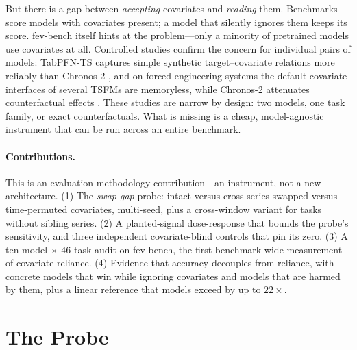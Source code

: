 \documentclass[letterpaper]{article}
\begin{document}
But there is a gap between \emph{accepting} covariates and \emph{reading} them.
Benchmarks score models with covariates present; a model that silently ignores them
keeps its score. fev-bench itself hints at the problem---only a minority of pretrained
models use covariates at all. Controlled studies confirm the concern for individual
pairs of models: TabPFN-TS captures simple synthetic target--covariate relations more
reliably than Chronos-2 \citep{berthelier2026investigating}, and on forced engineering
systems the default covariate interfaces of several TSFMs are memoryless, while
Chronos-2 attenuates counterfactual effects \citep{won2026attenuated}. These studies
are narrow by design: two models, one task family, or exact counterfactuals. What is
missing is a cheap, model-agnostic instrument that can be run across an entire
benchmark.

\paragraph{Contributions.}
This is an evaluation-methodology contribution---an instrument, not a new
architecture.
(1) The \emph{swap-gap} probe: intact versus cross-series-swapped versus
time-permuted covariates, multi-seed, plus a cross-window variant for tasks without
sibling series.
(2) A planted-signal dose-response that bounds the probe's sensitivity, and three
independent covariate-blind controls that pin its zero.
(3) A ten-model $\times$ 46-task audit on fev-bench, the first benchmark-wide
measurement of covariate reliance.
(4) Evidence that accuracy decouples from reliance, with concrete models that win
while ignoring covariates and models that are harmed by them, plus a linear
reference that models exceed by up to $22\times$.

\section{The Probe}
\end{document}
